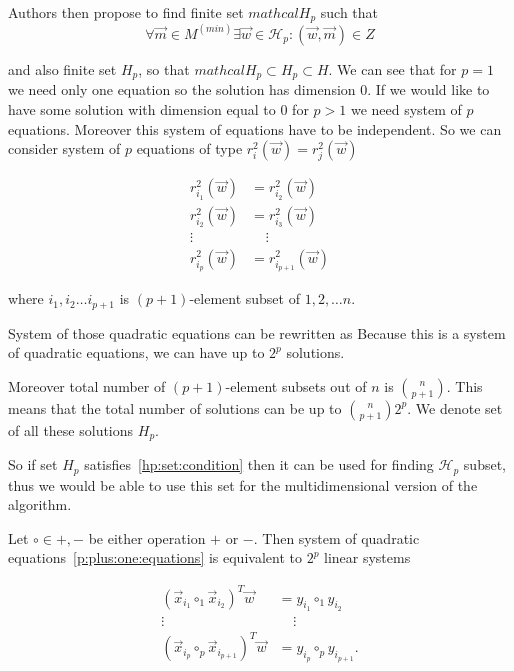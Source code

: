 Authors then propose to find finite set $mathcal{H}_p$ such that 
\begin{equation} \label{hp:set:condition}
    \forall \vec{m} \in M^{(min)} \exists \vec{w} \in \mathcal{H}_p : (\vec{w},\vec{m}) \in Z
\end{equation}

and also finite set $H_p$, so that $mathcal{H}_p \subset H_p \subset H$. We can see that for $p=1$ we need only one equation so the solution has dimension $0$. If we would like to have some solution with dimension equal to $0$ for $p > 1$ we need system of $p$ equations. Moreover this system of equations have to be independent. So we can consider system of $p$ equations of type $ r^{2}_i(\vec{w}) = r^{2}_j(\vec{w})$

\begin{align} 
    r^{2}_{i_1}(\vec{w}) &= r^{2}_{i_2}(\vec{w}) \label{p:plus:one:equations}   \\
    r^{2}_{i_2}(\vec{w}) &= r^{2}_{i_3}(\vec{w}) \nonumber  \\
    \vdots \ \ \  & \ \ \ \  \ \vdots  \nonumber \\ 
    r^{2}_{i_p}(\vec{w}) &=  r^{2}_{i_{p+1}}(\vec{w}) \nonumber 
\end{align}

where $i_1, i_2 \ldots i_{p+1}$  is $(p+1)$-element subset of ${1, 2, \ldots n}$.


System of those quadratic equations can be rewritten as 
Because this is a system of quadratic equations, we can have up to $2^p$ solutions.

Moreover total number of $(p+1)$-element subsets out of $n$ is $\binom{n}{p+1}$.
This means that the total number of solutions can be up to $\binom{n}{p+1} 2^p$. 
We denote set of all these solutions $H_p$.

So if set $H_p$ satisfies~\eqref{hp:set:condition} then it can be used for finding $\mathcal{H}_p$ subset, thus we would be able to use this set for the multidimensional version of the algorithm.

Let $\circ \in {+, -}$ be either operation $+$ or $-$. Then system of quadratic equations~\eqref{p:plus:one:equations} is equivalent to $2^p$ linear systems

\begin{align} 
    (\vec{x}_{i_1} \circ_1 \vec {x}_{i_2} )^T \vec{w} &= y_{i_1} \circ_1 y_{i_2} \label{p:plus:one:equations:linear}   \\
    \vdots \ \ \  & \ \ \ \  \ \vdots  \nonumber \\ 
    (\vec{x}_{i_p} \circ_p \vec {x}_{i_{p+1}} )^T \vec{w} &= y_{i_p} \circ_p y_{i_{p+1}}. \nonumber 
\end{align}

